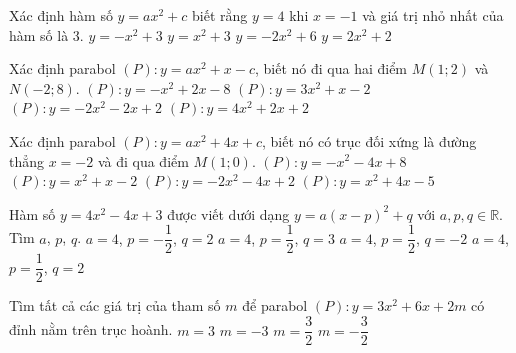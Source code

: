 \begin{ex}%
	Xác định hàm số $y=ax^2+c$ biết rằng $y=4$ khi $x = -1$ và giá trị nhỏ nhất của hàm số là $3$.
	\choice
	{$ y = -x^2+3 $}
	{\True $ y = x^2+3$}
	{$ y = -2x^2+6 $}
	{$ y = 2x^2+2 $}
\end{ex}

\begin{ex}%
	Xác định parabol $(P):  y=ax^2+x-c$, biết nó đi qua hai điểm $M(1;2)$ và $N(-2;8).$
	\choice
	{$(P):  y = -x^2+2x - 8 $}
	{\True $(P):  y = 3x^2+x -2 $}
	{$(P): y = -2x^2-2x +2 $}
	{$(P): y =  4x^2+ 2x +2 $}
\end{ex}

\begin{ex}%
	Xác định parabol $(P):  y=ax^2+4x+c$, biết nó có trục đối xứng là đường thẳng $x = -2$ và đi qua  điểm $M(1;0)$.
	\choice
	{$(P):  y = -x^2-4x + 8$}
	{$(P):  y = x^2+x -2$}
	{$(P):  y = -2x^2-4x +2$}
	{\True $(P):  y =  x^2+ 4x -5$}
\end{ex}

\begin{ex}%
	Hàm số $y = 4x^2-4x+3$ được viết dưới dạng $y=a(x-p)^2+q$ với $a,p,q \in  \mathbb{R}.$ Tìm $a$, $p$, $q$.
	\choice
	{$a = 4$, $p =- \dfrac{1}{2}$, $q = 2$}
	{$a = 4$, $p = \dfrac{1}{2}$, $q = 3$}
	{$a = 4$, $p = \dfrac{1}{2}$, $q = -2$}
	{\True $a = 4$, $p = \dfrac{1}{2}$, $q = 2$}
\end{ex}

\begin{ex}%
	Tìm tất cả các giá trị của tham số $m$ để parabol $(P):  y=3x^2+6x+2m$ có đỉnh nằm trên trục hoành.
	\choice
	{$m=3$}
	{$m=-3$}
	{\True $m=\dfrac{3}{2}$}
	{$m=-\dfrac{3}{2}$}
\end{ex}

